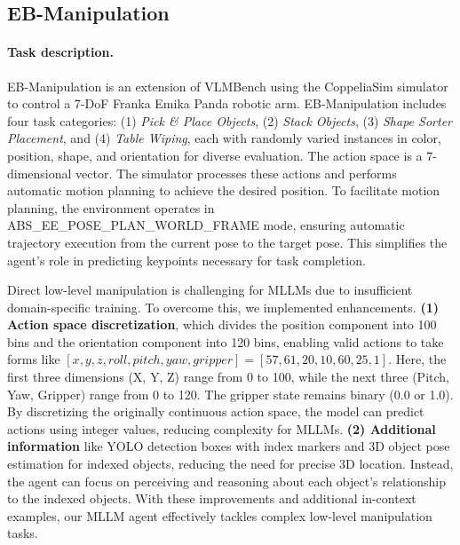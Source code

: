 \subsection{EB-Manipulation}
\paragraph{Task description.} 
EB-Manipulation is an extension of VLMBench \cite{zheng2022vlmbench} using the CoppeliaSim simulator \cite{rohmer2013v} to control a 7-DoF Franka Emika Panda robotic arm. EB-Manipulation includes four task categories: (1) \textit{Pick \& Place Objects}, (2) \textit{Stack Objects}, (3) \textit{Shape Sorter Placement}, and (4) \textit{Table Wiping}, each with randomly varied instances in color, position, shape, and orientation for diverse evaluation. The action space is a 7-dimensional vector. The simulator processes these actions and performs automatic motion planning to achieve the desired position. To facilitate motion planning, the environment operates in ABS\_EE\_POSE\_PLAN\_WORLD\_FRAME mode, ensuring automatic trajectory execution from the current pose to the target pose. This simplifies the agent’s role in predicting keypoints necessary for task completion. 



Direct low-level manipulation is challenging for MLLMs due to insufficient domain-specific training. To overcome this, we implemented enhancements. \textbf{(1) Action space discretization}\cite{yin2024context}, which divides the position component into 100 bins and the orientation component into 120 bins, enabling valid actions to take forms like $[x, y, z, roll, pitch, yaw, gripper]=[57,61,20,10,60,25,1]$. Here, the first three dimensions (X, Y, Z) range from 0 to 100, while the next three (Pitch, Yaw, Gripper) range from 0 to 120. The gripper state remains binary (0.0 or 1.0). By discretizing the originally continuous action space, the model can predict actions using integer values, reducing complexity for MLLMs. \textbf{(2) Additional information} like YOLO \cite{redmon2016you} detection boxes with index markers and 3D object pose estimation for indexed objects, reducing the need for precise 3D location. Instead, the agent can focus on perceiving and reasoning about each object's relationship to the indexed objects. With these improvements and additional in-context examples, our MLLM agent effectively tackles complex low-level manipulation tasks.





